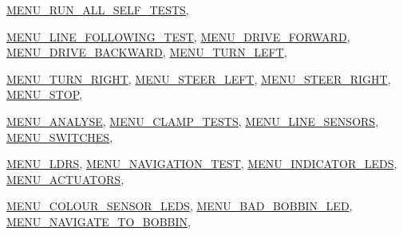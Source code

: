 \begin{DoxyCompactItemize}
\hyperlink{namespaceIDP_ac1d3c3b62448912be4da9f2728f2af99adda52b9f226e94ccf52c9adc477dab37}{MENU\_\-RUN\_\-ALL\_\-SELF\_\-TESTS}, 
\par
\hyperlink{namespaceIDP_ac1d3c3b62448912be4da9f2728f2af99a1aa3dace9f087c1336551f4beda7492e}{MENU\_\-LINE\_\-FOLLOWING\_\-TEST}, 
\hyperlink{namespaceIDP_ac1d3c3b62448912be4da9f2728f2af99a9df5e55c1ef501f357d859392c72e630}{MENU\_\-DRIVE\_\-FORWARD}, 
\hyperlink{namespaceIDP_ac1d3c3b62448912be4da9f2728f2af99abc427a1c6b01c8735c08b7400ec27428}{MENU\_\-DRIVE\_\-BACKWARD}, 
\hyperlink{namespaceIDP_ac1d3c3b62448912be4da9f2728f2af99a0b9c5176d49d3809e80cd23d00c9a801}{MENU\_\-TURN\_\-LEFT}, 
\par
\hyperlink{namespaceIDP_ac1d3c3b62448912be4da9f2728f2af99af972ee0a2346477962f78898dfe4523a}{MENU\_\-TURN\_\-RIGHT}, 
\hyperlink{namespaceIDP_ac1d3c3b62448912be4da9f2728f2af99a3eb3b6a326b6104a57b7b09f73afabf4}{MENU\_\-STEER\_\-LEFT}, 
\hyperlink{namespaceIDP_ac1d3c3b62448912be4da9f2728f2af99ae351c54a8e15c97cf27f0e017f495b31}{MENU\_\-STEER\_\-RIGHT}, 
\hyperlink{namespaceIDP_ac1d3c3b62448912be4da9f2728f2af99a1a3e265ab5e1a2afda873da8c1cb7d9f}{MENU\_\-STOP}, 
\par
\hyperlink{namespaceIDP_ac1d3c3b62448912be4da9f2728f2af99aa80af753125b39e64ca61a80af90a880}{MENU\_\-ANALYSE}, 
\hyperlink{namespaceIDP_ac1d3c3b62448912be4da9f2728f2af99aaa8e1942bc82d177052cd99e827dd601}{MENU\_\-CLAMP\_\-TESTS}, 
\hyperlink{namespaceIDP_ac1d3c3b62448912be4da9f2728f2af99a1454106f5e7503695da693c6acc3157d}{MENU\_\-LINE\_\-SENSORS}, 
\hyperlink{namespaceIDP_ac1d3c3b62448912be4da9f2728f2af99a88c747088c71c27488b3f6b7329c82d1}{MENU\_\-SWITCHES}, 
\par
\hyperlink{namespaceIDP_ac1d3c3b62448912be4da9f2728f2af99a23b85d38bad05a11ce6e04afa51e0739}{MENU\_\-LDRS}, 
\hyperlink{namespaceIDP_ac1d3c3b62448912be4da9f2728f2af99abab1528689e53a7505abeef47c6ca67e}{MENU\_\-NAVIGATION\_\-TEST}, 
\hyperlink{namespaceIDP_ac1d3c3b62448912be4da9f2728f2af99afddaf453d9ae15169ca218fa9e0ab077}{MENU\_\-INDICATOR\_\-LEDS}, 
\hyperlink{namespaceIDP_ac1d3c3b62448912be4da9f2728f2af99af06417b3ca00a4111eca5d60d0ac4c5a}{MENU\_\-ACTUATORS}, 
\par
\hyperlink{namespaceIDP_ac1d3c3b62448912be4da9f2728f2af99a8bb2f8096a6412f0d34e4d8eb1a4457c}{MENU\_\-COLOUR\_\-SENSOR\_\-LEDS}, 
\hyperlink{namespaceIDP_ac1d3c3b62448912be4da9f2728f2af99a8f1ae04cc067d7075792c69b7236267f}{MENU\_\-BAD\_\-BOBBIN\_\-LED}, 
\hyperlink{namespaceIDP_ac1d3c3b62448912be4da9f2728f2af99aed8778056e639b819d48ede426997a01}{MENU\_\-NAVIGATE\_\-TO\_\-BOBBIN}, 

\end{DoxyCompactItemize}

